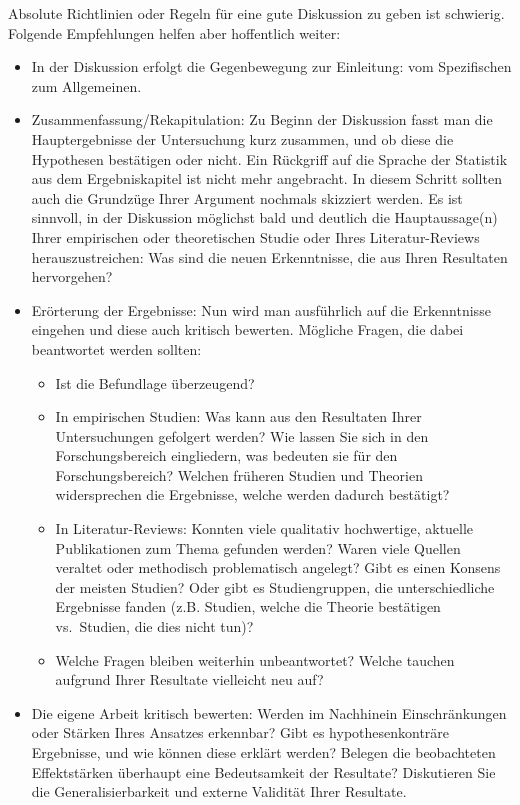 \documentclass[a4paper,12pt]{article}
\providecommand{\tightlist}{%
  \setlength{\itemsep}{0pt}\setlength{\parskip}{0pt}}
\begin{document}
Absolute Richtlinien oder Regeln für eine gute Diskussion zu geben ist schwierig. Folgende Empfehlungen helfen aber hoffentlich weiter:
\begin{itemize}
\tightlist
\item
  In der Diskussion erfolgt die Gegenbewegung zur Einleitung: vom Spezifischen zum Allgemeinen.
\item
  Zusammenfassung/Rekapitulation: Zu Beginn der Diskussion fasst man die Hauptergebnisse der Untersuchung kurz zusammen, und ob diese die Hypothesen bestätigen oder nicht. Ein Rückgriff auf die Sprache der Statistik aus dem Ergebniskapitel ist nicht mehr angebracht. In diesem Schritt sollten auch die Grundzüge Ihrer Argument nochmals skizziert werden.
  Es ist sinnvoll, in der Diskussion möglichst bald und deutlich die Hauptaussage(n) Ihrer empirischen oder theoretischen Studie oder Ihres Literatur-Reviews herauszustreichen: Was sind die neuen Erkenntnisse, die aus Ihren Resultaten hervorgehen?
\item
  Erörterung der Ergebnisse: Nun wird man ausführlich auf die Erkenntnisse eingehen und diese auch kritisch bewerten. Mögliche Fragen, die dabei beantwortet werden sollten:
  \begin{itemize}
  \tightlist
  \item
    Ist die Befundlage überzeugend?
  \item
    In empirischen Studien: Was kann aus den Resultaten Ihrer Untersuchungen gefolgert werden? Wie lassen Sie sich in den Forschungsbereich eingliedern, was bedeuten sie für den Forschungsbereich? Welchen früheren Studien und Theorien widersprechen die Ergebnisse, welche werden dadurch bestätigt?
  \item
    In Literatur-Reviews: Konnten viele qualitativ hochwertige, aktuelle Publikationen zum Thema gefunden werden? Waren viele Quellen veraltet oder methodisch problematisch angelegt? Gibt es einen Konsens der meisten Studien? Oder gibt es Studiengruppen, die unterschiedliche Ergebnisse fanden (z.B. Studien, welche die Theorie bestätigen vs.~Studien, die dies nicht tun)?
  \item
    Welche Fragen bleiben weiterhin unbeantwortet? Welche tauchen aufgrund Ihrer Resultate vielleicht neu auf?
  \end{itemize}
\item
  Die eigene Arbeit kritisch bewerten: Werden im Nachhinein Einschränkungen oder Stärken Ihres Ansatzes erkennbar? Gibt es hypothesenkonträre Ergebnisse, und wie können diese erklärt werden? Belegen die beobachteten Effektstärken überhaupt eine Bedeutsamkeit der Resultate? Diskutieren Sie die Generalisierbarkeit und externe Validität Ihrer Resultate.
\end{itemize}
\end{document}
